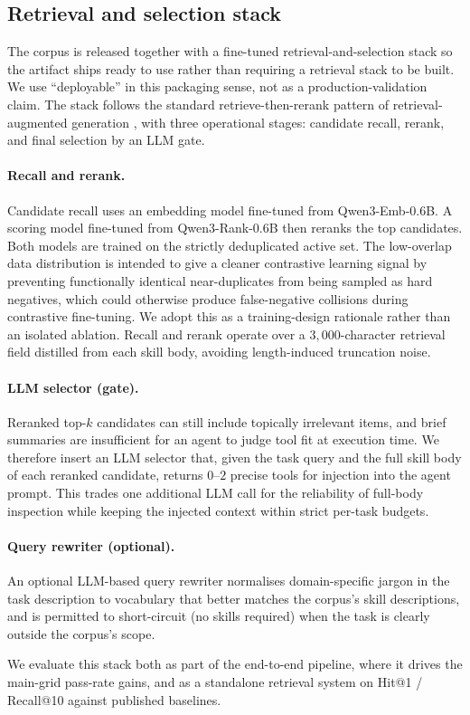 \subsection{Retrieval and selection stack}
\label{sec:retrieval}

The corpus is released together with a fine-tuned
retrieval-and-selection stack so the artifact ships ready to use
rather than requiring a retrieval stack to be built.  We use ``deployable'' in this packaging sense, not as a
production-validation claim.  The stack follows the standard
retrieve-then-rerank pattern of retrieval-augmented generation
\citep{Lewis2020RAG}, with three operational stages: candidate
recall, rerank, and final selection by an LLM gate.

\paragraph{Recall and rerank.}
Candidate recall uses an embedding model fine-tuned from
Qwen3-Emb-0.6B.  A scoring model fine-tuned from Qwen3-Rank-0.6B
then reranks the top candidates.  Both models are trained on
the strictly deduplicated active set.  The low-overlap data
distribution is intended to give a cleaner contrastive learning
signal by preventing functionally identical near-duplicates from
being sampled as hard negatives, which could otherwise produce
false-negative collisions during contrastive fine-tuning.  We
adopt this as a training-design rationale rather than an isolated
ablation.  Recall and rerank operate over a
$3{,}000$-character retrieval field distilled from each skill
body, avoiding length-induced truncation noise.

\paragraph{LLM selector (gate).}
Reranked top-$k$ candidates can still include topically
irrelevant items, and brief summaries are insufficient for an
agent to judge tool fit at execution time.  We therefore insert
an LLM selector that, given the task query and the full skill
body of each reranked candidate, returns $0$--$2$ precise tools
for injection into the agent prompt.  This trades one additional
LLM call for the reliability of full-body inspection while
keeping the injected context within strict per-task budgets.

\paragraph{Query rewriter (optional).}
An optional LLM-based query rewriter normalises domain-specific
jargon in the task description to vocabulary that better matches
the corpus's skill descriptions, and is permitted to short-circuit
(no skills required) when the task is clearly outside the
corpus's scope.

We evaluate this stack both as part of the end-to-end pipeline,
where it drives the main-grid pass-rate gains, and as a
standalone retrieval system on Hit@1 / Recall@10 against
published baselines.
